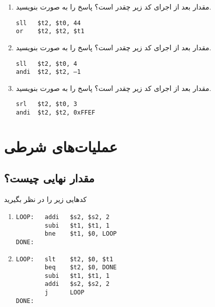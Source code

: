 \documentclass[11pt, dvipsnames, svgnames, x11names]{article}
\newcommand{\zohre}{زهره سورانی}
\begin{document}
\begin{enumerate}
\item 
مقدار  بعد از اجرای کد زیر چقدر است؟ پاسخ را به صورت  بنویسید.

\begin{latin}
\begin{lstlisting}
sll   $t2, $t0, 44
or    $t2, $t2, $t1
\end{lstlisting}
\end{latin}
\item 
مقدار  بعد از اجرای کد زیر چقدر است؟ پاسخ را به صورت  بنویسید.

\begin{latin}
\begin{lstlisting}[keywords={sll, andi}]
sll   $t2, $t0, 4
andi  $t2, $t2, –1
\end{lstlisting}
\end{latin}

\item 
مقدار  بعد از اجرای کد زیر چقدر است؟ پاسخ را به صورت  بنویسید.

\begin{latin}
\begin{lstlisting}[keywords={srl, andi}]
srl   $t2, $t0, 3
andi  $t2, $t2, 0xFFEF
\end{lstlisting}
\end{latin}
\end{enumerate}

\section{عملیات‌های شرطی }
\subsection[مقدار نهایی چیست؟]{مقدار نهایی چیست؟\RTLfootnote{\zohre}}
کد‌هایی زیر را در نظر بگیرید
\begin{latin}
\begin{enumerate}
\item
\begin{lstlisting}[keywords={addi, subi, bne}]
LOOP:   addi   $s2, $s2, 2
        subi   $t1, $t1, 1
        bne    $t1, $0, LOOP
DONE:
\end{lstlisting}

\item
\begin{lstlisting}[keywords={slt, beq, subi, addi, j}]
LOOP:   slt    $t2, $0, $t1
        beq    $t2, $0, DONE
        subi   $t1, $t1, 1
        addi   $s2, $s2, 2
        j      LOOP
DONE:
\end{lstlisting}
\end{enumerate}
\end{latin}
\end{document}
